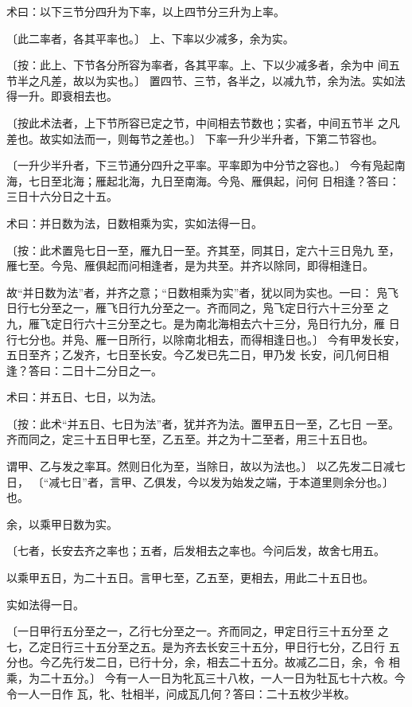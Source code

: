 \documentclass[a4paper,12pt,UTF8,twoside]{ctexbook}
\begin{document}
术曰：以下三节分四升为下率，以上四节分三升为上率。

〔此二率者，各其平率也。〕 上、下率以少减多，余为实。

〔按：此上、下节各分所容为率者，各其平率。上、下以少减多者，余为中 间五节半之凡差，故以为实也。〕 置四节、三节，各半之，以减九节，余为法。实如法得一升。即衰相去也。

〔按此术法者，上下节所容已定之节，中间相去节数也；实者，中间五节半 之凡差也。故实如法而一，则每节之差也。〕 下率一升少半升者，下第二节容也。

〔一升少半升者，下三节通分四升之平率。平率即为中分节之容也。〕 今有凫起南海，七日至北海；雁起北海，九日至南海。今凫、雁俱起，问何 日相逢？答曰：三日十六分日之十五。

术曰：并日数为法，日数相乘为实，实如法得一日。

〔按：此术置凫七日一至，雁九日一至。齐其至，同其日，定六十三日凫九 至，雁七至。今凫、雁俱起而问相逢者，是为共至。并齐以除同，即得相逢日。

故“并日数为法”者，并齐之意；“日数相乘为实”者，犹以同为实也。一曰： 凫飞日行七分至之一，雁飞日行九分至之一。齐而同之，凫飞定日行六十三分至 之九，雁飞定日行六十三分至之七。是为南北海相去六十三分，凫日行九分，雁 日行七分也。并凫、雁一日所行，以除南北相去，而得相逢日也。〕 今有甲发长安，五日至齐；乙发齐，七日至长安。今乙发已先二日，甲乃发 长安，问几何日相逢？答曰：二日十二分日之一。

术曰：并五日、七日，以为法。

〔按：此术“并五日、七日为法”者，犹并齐为法。置甲五日一至，乙七日 一至。齐而同之，定三十五日甲七至，乙五至。并之为十二至者，用三十五日也。

谓甲、乙与发之率耳。然则日化为至，当除日，故以为法也。〕 以乙先发二日减七日， 〔“减七日”者，言甲、乙俱发，今以发为始发之端，于本道里则余分也。〕 也。

余，以乘甲日数为实。

〔七者，长安去齐之率也；五者，后发相去之率也。今问后发，故舍七用五。

以乘甲五日，为二十五日。言甲七至，乙五至，更相去，用此二十五日也。

实如法得一日。

〔一日甲行五分至之一，乙行七分至之一。齐而同之，甲定日行三十五分至 之七，乙定日行三十五分至之五。是为齐去长安三十五分，甲日行七分，乙日行 五分也。今乙先行发二日，已行十分，余，相去二十五分。故减乙二日，余，令 相乘，为二十五分。〕 今有一人一日为牝瓦三十八枚，一人一日为牡瓦七十六枚。今令一人一日作 瓦，牝、牡相半，问成瓦几何？答曰：二十五枚少半枚。
\end{document}
